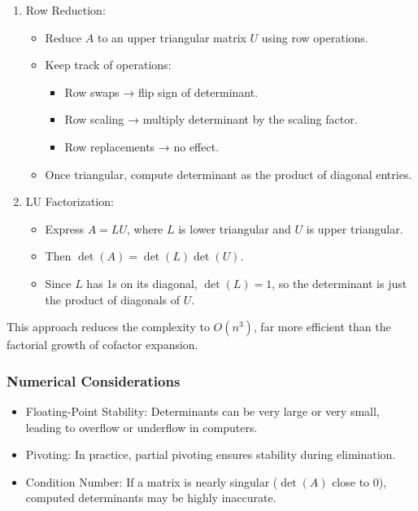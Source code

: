 \documentclass[
  letterpaper,
  DIV=11,
  numbers=noendperiod]{scrreprt}
\providecommand{\tightlist}{%
  \setlength{\itemsep}{0pt}\setlength{\parskip}{0pt}}
\begin{document}
\begin{enumerate}
\def\labelenumi{\arabic{enumi}.}
\item
  Row Reduction:

  \begin{itemize}
  \item
    Reduce \(A\) to an upper triangular matrix \(U\) using row
    operations.
  \item
    Keep track of operations:

    \begin{itemize}
    \tightlist
    \item
      Row swaps → flip sign of determinant.
    \item
      Row scaling → multiply determinant by the scaling factor.
    \item
      Row replacements → no effect.
    \end{itemize}
  \item
    Once triangular, compute determinant as the product of diagonal
    entries.
  \end{itemize}
\item
  LU Factorization:

  \begin{itemize}
  \tightlist
  \item
    Express \(A = LU\), where \(L\) is lower triangular and \(U\) is
    upper triangular.
  \item
    Then \(\det(A) = \det(L)\det(U)\).
  \item
    Since \(L\) has 1s on its diagonal, \(\det(L)=1\), so the
    determinant is just the product of diagonals of \(U\).
  \end{itemize}
\end{enumerate}

This approach reduces the complexity to \(O(n^3)\), far more efficient
than the factorial growth of cofactor expansion.

\subsubsection{Numerical Considerations}\label{numerical-considerations}

\begin{itemize}
\tightlist
\item
  Floating-Point Stability: Determinants can be very large or very
  small, leading to overflow or underflow in computers.
\item
  Pivoting: In practice, partial pivoting ensures stability during
  elimination.
\item
  Condition Number: If a matrix is nearly singular (\(\det(A)\) close to
  0), computed determinants may be highly inaccurate.
\end{itemize}
\end{document}
